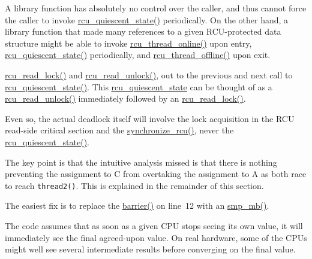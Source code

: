 
	A library function has absolutely no control over the caller,
	and thus cannot force the caller to invoke \url{rcu_quiescent_state()}
	periodically.
	On the other hand, a library function that made many references
	to a given RCU-protected data structure might be able to invoke
	\url{rcu_thread_online()} upon entry,
	\url{rcu_quiescent_state()} periodically, and
	\url{rcu_thread_offline()} upon exit.


	\url{rcu_read_lock()} and \url{rcu_read_unlock()}, out to
	the previous and next call to \url{rcu_quiescent_state()}.
	This \url{rcu_quiescent_state} can be thought of as a
	\url{rcu_read_unlock()} immediately followed by an
	\url{rcu_read_lock()}.

	Even so, the actual deadlock itself will involve the lock
	acquisition in the RCU read-side critical section and
	the \url{synchronize_rcu()}, never the \url{rcu_quiescent_state()}.


	The key point is that the intuitive analysis missed is that
	there is nothing preventing the assignment to C from overtaking
	the assignment to A as both race to reach {\tt thread2()}.
	This is explained in the remainder of this section.


	The easiest fix is to replace the \url{barrier()} on
	line~12 with an \url{smp_mb()}.


	   The code assumes that as soon as a given CPU stops
	   seeing its own value, it will immediately see the
	   final agreed-upon value.
	   On real hardware, some of the CPUs might well see several
	   intermediate results before converging on the final value.

